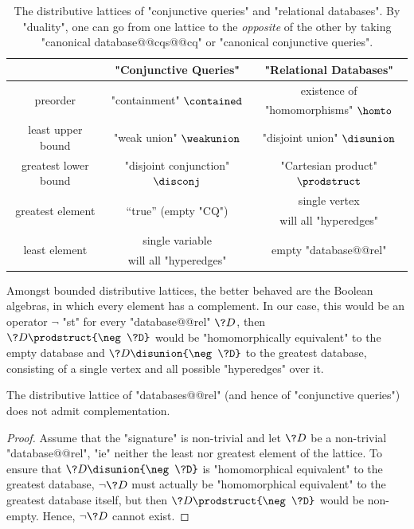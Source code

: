 \begin{table}
	\centering
	\begin{tabular}{ccc}
		\toprule
		 & "Conjunctive Queries" & "Relational Databases" \\ \midrule
		\multirow{2}{*}{preorder} & \multirow{2}{*}{"containment" $\contained$} & existence of\\
		& & "homomorphisms" $\homto$ \\
		least upper bound & "weak union" $\weakunion$ & "disjoint union" $\disunion$ \\
		greatest lower bound & "disjoint conjunction" $\disconj$ & "Cartesian product" $\prodstruct$ \\ 
		\multirow{2}{*}{greatest element} & \multirow{2}{*}{``true'' (empty "CQ")} & single vertex \\
		& & will all "hyperedges" \\
		\multirow{2}{*}{least element} & single variable & \multirow{2}{*}{empty "database@@rel"}
		\\
		& will all "hyperedges" & \\ \bottomrule
	\end{tabular}
	\caption{
		\AP\label{tab:distributive-lattices}
		The distributive lattices of "conjunctive queries" and "relational databases".
		By "duality", one can go from one lattice to the \emph{opposite} of the other
		by taking "canonical database@@cqs@@cq" or "canonical conjunctive queries".}
\end{table}

Amongst bounded distributive lattices, the better behaved are
the Boolean algebras, in which every element has a complement.
In our case, this would be an operator $\neg$ "st" for every "database@@rel" $\?D$,
then $\?D \prodstruct {\neg \?D}$ would be "homomorphically equivalent" to
the empty database and $\?D \disunion {\neg \?D}$ to the greatest database,
consisting of a single vertex and all possible "hyperedges" over it.

\begin{proposition}
	The distributive lattice of "databases@@rel" (and hence of
	"conjunctive queries") does not admit complementation.
\end{proposition}

\begin{proof}
	Assume that the "signature" is non-trivial and let $\?D$ be a non-trivial "database@@rel",
	"ie" neither the least nor greatest element of the lattice.
	To ensure that $\?D \disunion {\neg \?D}$ is "homomorphical equivalent"
	to the greatest database, $\neg \?D$ must actually be "homomorphical equivalent" to 
	the greatest database itself,
	but then $\?D \prodstruct {\neg \?D}$ would be non-empty.
	Hence, $\neg \?D$ cannot exist.
\end{proof}

